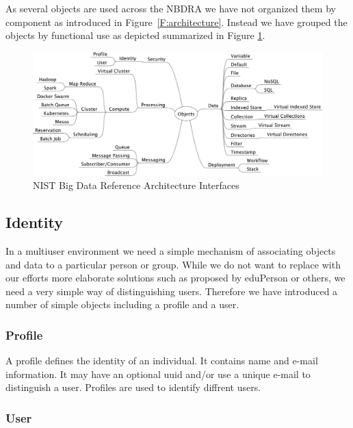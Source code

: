 \documentclass[10pt]{article}
\begin{document}
As several objects are used across the NBDRA we have not organized
them by component as introduced in
Figure~\ref{F:architecture}. Instead we have grouped the objects by
functional use as depicted summarized in Figure \ref{F:interfaces}.

\begin{figure}[h]\centering
\includegraphics[width=1.1\textwidth]{images/interfaces}
\caption{NIST Big Data Reference Architecture Interfaces}
\label{F:interfaces}
\end{figure}


\subsection{Identity}

In a multiuser environment we need a simple mechanism of associating
objects and data to a particular person or group. While we do not want
to replace with our efforts more elaborate solutions such as proposed
by eduPerson \cite{www-eduperson} or others, we need a very simple way
of distinguishing users. Therefore we have introduced a number of
simple objects including a profile and a user.

\subsubsection{Profile}

A profile defines the identity of an individual. It contains name and
e-mail information. It may have an optional uuid and/or use a unique
e-mail to distinguish a user. Profiles are used to identify diffrent
users.


\subsubsection{User}
\end{document}
